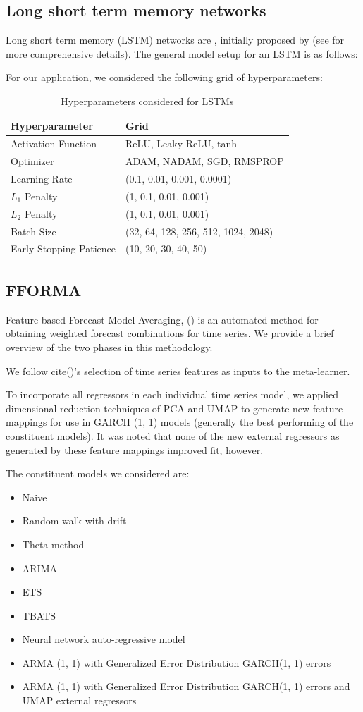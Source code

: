 \documentclass{article}
\begin{document}
\subsection{Long short term memory networks}
Long short term memory (LSTM) networks are , initially proposed by \cite{hochreiter_long_1997} (see for more comprehensive details). The general model setup for an LSTM is as follows:

For our application, we considered the following grid of hyperparameters:
\begin{table}[!htb]
	\begin{tabular}{|ll|}
		\hline
		Hyperparameter & Grid \\ \hline
		Activation Function & ReLU, Leaky ReLU, tanh \\
		Optimizer & ADAM, NADAM, SGD, RMSPROP \\
		Learning Rate & (0.1, 0.01, 0.001, 0.0001)\\
		$L_1$ Penalty & (1, 0.1, 0.01, 0.001) \\
		$L_2$ Penalty & (1, 0.1, 0.01, 0.001) \\
		Batch Size & (32, 64, 128, 256, 512, 1024, 2048) \\
		Early Stopping Patience & (10, 20, 30, 40, 50) \\ \hline
	\end{tabular}
	\caption{Hyperparameters considered for LSTMs}
\end{table}

\subsection{FFORMA}
Feature-based Forecast Model Averaging, (\cite{montero-manso_fforma_2020}) is an automated method for obtaining weighted forecast combinations for time series. We provide a brief overview of the two phases in this methodology.

We follow cite()'s selection of time series features as inputs to the meta-learner. 

To incorporate all regressors in each individual time series model, we applied dimensional reduction techniques of PCA and UMAP to generate new feature mappings for use in GARCH (1, 1) models (generally the best performing of the constituent models). It was noted that none of the new external regressors as generated by these feature mappings improved fit, however.

The constituent models we considered are:
\begin{itemize}
	\item Naive
	\item Random walk with drift
	\item Theta method
	\item ARIMA
	\item ETS
	\item TBATS
	\item Neural network auto-regressive model
	\item ARMA (1, 1) with Generalized Error Distribution GARCH(1, 1) errors
	\item ARMA (1, 1) with Generalized Error Distribution GARCH(1, 1) errors and UMAP external regressors
\end{itemize}
\end{document}
